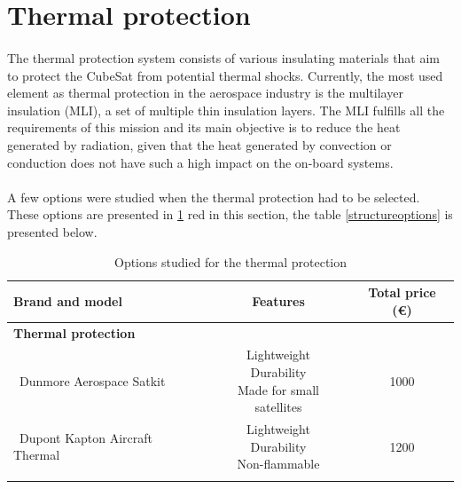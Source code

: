 \section{Thermal protection}
\paragraph{}The thermal protection system consists of various insulating materials that aim to protect the CubeSat from potential thermal shocks. Currently, the most used element as thermal protection in the aerospace industry is the multilayer insulation (MLI), a set of multiple thin insulation layers. The MLI fulfills all the requirements of this mission and its main objective is to reduce the heat generated by radiation, given that the heat generated by convection or conduction does not have such a high impact on the on-board systems.

\paragraph{}A few options were studied when the thermal protection had to be selected. These options are presented in \ref{thermaloptions}
red in this section, the table \ref{structureoptions} is presented below.

\begin{longtable}{| l | c | c | }
\hline
\rowcolor[gray]{0.80}	\textbf{Brand and model} &  \textbf{Features}     & \textbf{Total price (\euro)}   \\
\hline
\endfirsthead
\rowcolor[gray]{0.85} \textbf{Thermal protection} &  &  \\
	   ~Dunmore Aerospace Satkit & \makecell{Lightweight \\ Durability \\ Made for small satellites}& 1000 \\
	   \hline
	   ~Dupont Kapton Aircraft Thermal & \makecell{Lightweight \\ Durability \\ Non-flammable} & 1200 \\
	\hline

\caption{Options studied for the thermal protection}
\label{thermaloptions}
\end{longtable}
